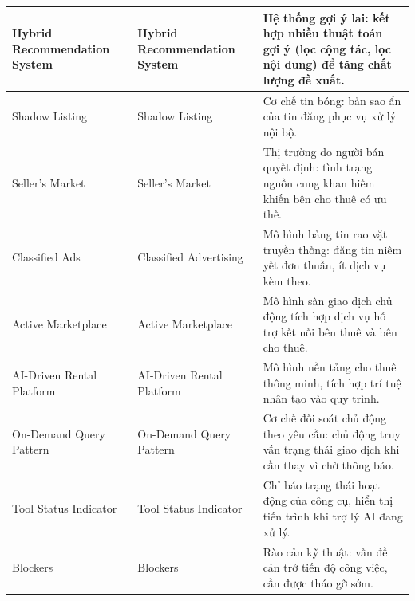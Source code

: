 \begin{longtable}{|L{0.18\textwidth}|L{0.27\textwidth}|L{0.49\textwidth}|}
Hybrid Recommendation System & Hybrid Recommendation System & Hệ thống gợi ý lai: kết hợp nhiều thuật toán gợi ý (lọc cộng tác, lọc nội dung) để tăng chất lượng đề xuất. \\
\hline

Shadow Listing & Shadow Listing & Cơ chế tin bóng: bản sao ẩn của tin đăng phục vụ xử lý nội bộ. \\
\hline

Seller's Market & Seller's Market & Thị trường do người bán quyết định: tình trạng nguồn cung khan hiếm khiến bên cho thuê có ưu thế. \\
\hline

Classified Ads & Classified Advertising & Mô hình bảng tin rao vặt truyền thống: đăng tin niêm yết đơn thuần, ít dịch vụ kèm theo. \\
\hline

Active Marketplace & Active Marketplace & Mô hình sàn giao dịch chủ động tích hợp dịch vụ hỗ trợ kết nối bên thuê và bên cho thuê. \\
\hline

AI-Driven Rental Platform & AI-Driven Rental Platform & Mô hình nền tảng cho thuê thông minh, tích hợp trí tuệ nhân tạo vào quy trình. \\
\hline

On-Demand Query Pattern & On-Demand Query Pattern & Cơ chế đối soát chủ động theo yêu cầu: chủ động truy vấn trạng thái giao dịch khi cần thay vì chờ thông báo. \\
\hline

Tool Status Indicator & Tool Status Indicator & Chỉ báo trạng thái hoạt động của công cụ, hiển thị tiến trình khi trợ lý AI đang xử lý. \\
\hline

Blockers & Blockers & Rào cản kỹ thuật: vấn đề cản trở tiến độ công việc, cần được tháo gỡ sớm. \\
\hline


\end{longtable}

